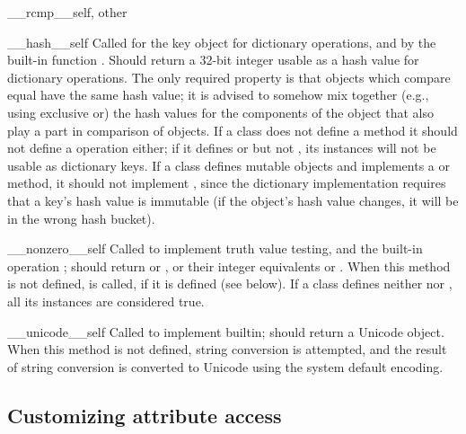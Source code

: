 \begin{methoddesc}[object]{__rcmp__}{self, other}
\end{methoddesc}

\begin{methoddesc}[object]{__hash__}{self}
Called for the key object for dictionary
operations, and by the built-in function
.  Should return a 32-bit integer
usable as a hash value
for dictionary operations.  The only required property is that objects
which compare equal have the same hash value; it is advised to somehow
mix together (e.g., using exclusive or) the hash values for the
components of the object that also play a part in comparison of
objects.  If a class does not define a  method it should
not define a  operation either; if it defines
 or  but not ,
its instances will not be usable as dictionary keys.  If a class
defines mutable objects and implements a  or
 method, it should not implement ,
since the dictionary implementation requires that a key's hash value
is immutable (if the object's hash value changes, it will be in the
wrong hash bucket).
\end{methoddesc}

\begin{methoddesc}[object]{__nonzero__}{self}
Called to implement truth value testing, and the built-in operation
; should return  or , or their
integer equivalents  or .
When this method is not defined,  is
called, if it is defined (see below).  If a class defines neither
 nor , all its instances are
considered true.
\end{methoddesc}

\begin{methoddesc}[object]{__unicode__}{self}
Called to implement  builtin;
should return a Unicode object. When this method is not defined, string
conversion is attempted, and the result of string conversion is converted
to Unicode using the system default encoding.
\end{methoddesc}


\subsection{Customizing attribute access\label{attribute-access}}

